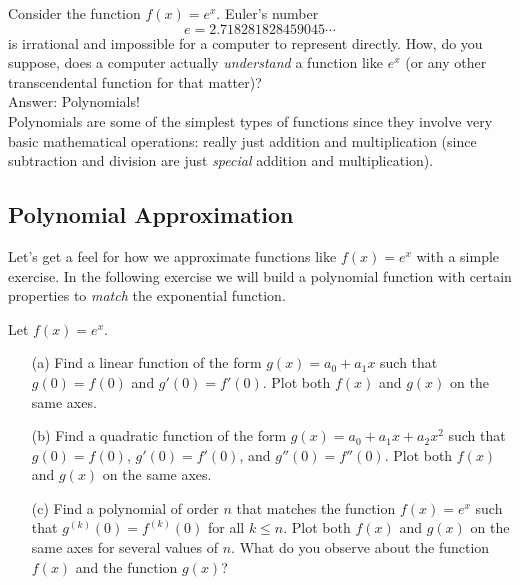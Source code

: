 Consider the function $f(x) = e^x$.  Euler's number
\[ e = 2.718281828459045\cdots \]
is irrational and
impossible for a computer to represent directly.  How, do you suppose, does
a computer actually {\it understand} a function like $e^x$ (or any other
transcendental function for that matter)? \\
Answer: Polynomials! \\
Polynomials are some of the simplest types of functions since they involve very basic
mathematical operations: really just addition and multiplication (since subtraction
and division are just {\it special} addition and multiplication).  

\subsection{Polynomial Approximation}
Let's get a feel for how we approximate functions like $f(x) = e^x$ with a simple
exercise. In the following exercise we will build a polynomial function with certain
properties to {\it match} the exponential function.
\begin{problem}\label{prob:taylor_intro}
    Let $f(x) = e^x$.
    \begin{enumerate}
        \item[(a)] Find a linear function of the form $g(x) = a_0 + a_1 x$ such that $g(0)
            = f(0)$ and $g'(0) = f'(0)$.  Plot both $f(x)$ and $g(x)$ on the same axes. 
        \item[(b)] Find a quadratic function of the form $g(x) = a_0 + a_1 x + a_2 x^2$
            such that $g(0) = f(0)$, $g'(0) = f'(0)$, and $g''(0) = f''(0)$.  Plot both $f(x)$ and $g(x)$ on the same axes. 
        \item[(c)] Find a polynomial of order $n$ that matches the function $f(x) = e^x$
            such that $g^{(k)}(0) = f^{(k)}(0)$ for all $k \le n$.  Plot both $f(x)$ and
            $g(x)$ on the same axes for several values of $n$.  What do you observe about
            the function $f(x)$ and the function $g(x)$? \solution{
                \[ g(x) = 1 + x + \frac{x^2}{2} + \frac{x^3}{3!} + \frac{x^4}{4!} + \cdots
                    + \frac{x^n}{n!}. \]
            }
    \end{enumerate}
\end{problem}

